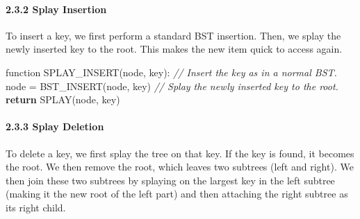 \documentclass[
]{article}
\newenvironment{Shaded}{}{}
\newcommand{\CommentTok}[1]{\textcolor[rgb]{0.38,0.63,0.69}{\textit{#1}}}
\newcommand{\ControlFlowTok}[1]{\textcolor[rgb]{0.00,0.44,0.13}{\textbf{#1}}}
\newcommand{\NormalTok}[1]{#1}
\begin{document}
\hypertarget{splay-insertion}{%
\paragraph{2.3.2 Splay Insertion}\label{splay-insertion}}

To insert a key, we first perform a standard BST insertion. Then, we
splay the newly inserted key to the root. This makes the new item quick
to access again.

\begin{pcode}

\begin{Shaded}
\begin{Highlighting}[]
\NormalTok{function SPLAY\_INSERT(node, key):}
  \CommentTok{// Insert the key as in a normal BST.}
\NormalTok{  node = BST\_INSERT(node, key)}
  \CommentTok{// Splay the newly inserted key to the root.}
  \ControlFlowTok{return}\NormalTok{ SPLAY(node, key)}
\end{Highlighting}
\end{Shaded}

\end{pcode}

\hypertarget{splay-deletion}{%
\paragraph{2.3.3 Splay Deletion}\label{splay-deletion}}

To delete a key, we first splay the tree on that key. If the key is
found, it becomes the root. We then remove the root, which leaves two
subtrees (left and right). We then join these two subtrees by splaying
on the largest key in the left subtree (making it the new root of the
left part) and then attaching the right subtree as its right child.
\end{document}
